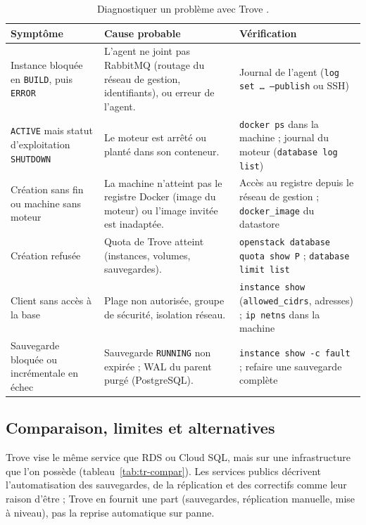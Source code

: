 \begin{table}[!ht]
\centering
\renewcommand{\arraystretch}{1.3}
\begin{tabular}{@{}>{\raggedright\arraybackslash}p{3.6cm}>{\raggedright\arraybackslash}p{6.4cm}>{\raggedright\arraybackslash}p{5.5cm}@{}}
\toprule
\textbf{Symptôme} & \textbf{Cause probable} & \textbf{Vérification} \\
\midrule
Instance bloquée en \texttt{BUILD}, puis \texttt{ERROR} & L'agent ne joint pas RabbitMQ (routage du réseau de gestion, identifiants), ou erreur de l'agent. & Journal de l'agent (\texttt{log set \dots{} --publish} ou SSH) \\
\texttt{ACTIVE} mais statut d'exploitation \texttt{SHUTDOWN} & Le moteur est arrêté ou planté dans son conteneur. & \texttt{docker ps} dans la machine ; journal du moteur (\texttt{database log list}) \\
Création sans fin ou machine sans moteur & La machine n'atteint pas le registre Docker (image du moteur) ou l'image invitée est inadaptée. & Accès au registre depuis le réseau de gestion ; \texttt{docker\_image} du datastore \\
Création refusée & Quota de Trove atteint (instances, volumes, sauvegardes). & \texttt{openstack database quota show P} ; \texttt{database limit list} \\
Client sans accès à la base & Plage non autorisée, groupe de sécurité, isolation réseau. & \texttt{instance show} (\texttt{allowed\_cidrs}, adresses) ; \texttt{ip netns} dans la machine \\
Sauvegarde bloquée ou incrémentale en échec & Sauvegarde \texttt{RUNNING} non expirée ; WAL du parent purgé (PostgreSQL). & \texttt{instance show -c fault} ; refaire une sauvegarde complète \\
\bottomrule
\end{tabular}
\caption{Diagnostiquer un problème avec Trove \parencite{trove-troubleshooting,trove-backup,trove-netiso}.}
\label{tab:tr-pannes}
\end{table}

\subsection{Comparaison, limites et alternatives}\label{sec:tr-compar}

Trove vise le même service que RDS ou Cloud SQL, mais sur une infrastructure que l'on possède (tableau~\ref{tab:tr-compar}). Les services
publics décrivent l'automatisation des sauvegardes, de la réplication et des correctifs comme leur raison d'être
\parencite{aws-rds,gcp-cloudsql} ; Trove en fournit une part (sauvegardes, réplication manuelle, mise à niveau), pas la reprise
automatique sur panne.

